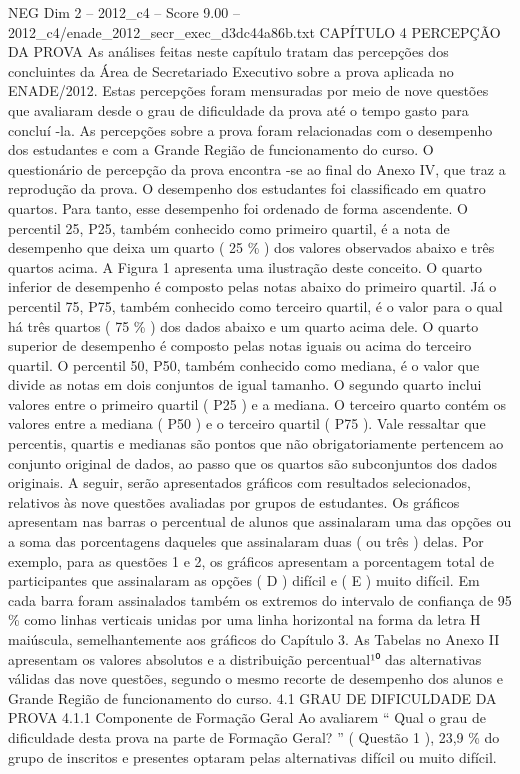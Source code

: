 \begin{textsample}{NEG Dim 2 – 2012\_c4 – Score 9.00 – 2012\_c4/enade\_2012\_secr\_exec\_d3dc44a86b.txt}  \label{ex:f2_neg_326}
CAPÍTULO 4 PERCEPÇÃO DA PROVA As análises feitas neste capítulo tratam das percepções dos concluintes da Área de Secretariado Executivo sobre a prova aplicada no ENADE/2012.
Estas percepções foram mensuradas por meio de nove questões que avaliaram desde o grau de dificuldade da prova até o tempo gasto para concluí -la.
As percepções sobre a prova foram relacionadas com o desempenho dos estudantes e com a Grande Região de funcionamento do curso.
O questionário de percepção da prova encontra -se ao final do Anexo IV, que traz a reprodução da prova.
O desempenho dos estudantes foi classificado em quatro quartos.
Para tanto, esse desempenho foi ordenado de forma ascendente.
O percentil 25, P25, também conhecido como primeiro quartil, é a nota de desempenho que deixa um quarto ( 25 \% ) dos valores observados abaixo e três quartos acima.
A Figura 1 apresenta uma ilustração deste conceito.
O quarto inferior de desempenho é composto pelas notas abaixo do primeiro quartil.
Já o percentil 75, P75, também conhecido como terceiro quartil, é o valor para o qual há três quartos ( 75 \% ) dos dados abaixo e um quarto acima dele.
O quarto superior de desempenho é composto pelas notas iguais ou acima do terceiro quartil.
O percentil 50, P50, também conhecido como mediana, é o valor que divide as notas em dois conjuntos de igual tamanho.
O segundo quarto inclui valores entre o primeiro quartil ( P25 ) e a mediana.
O terceiro quarto contém os valores entre a mediana ( P50 ) e o terceiro quartil ( P75 ).
Vale ressaltar que percentis, quartis e medianas são pontos que não obrigatoriamente pertencem ao conjunto original de dados, ao passo que os quartos são subconjuntos dos dados originais.
A seguir, serão apresentados gráficos com resultados selecionados, relativos às nove questões avaliadas por grupos de estudantes.
Os gráficos apresentam nas barras o percentual de alunos que assinalaram uma das opções ou a soma das porcentagens daqueles que assinalaram duas ( ou três ) delas.
Por exemplo, para as questões 1 e 2, os gráficos apresentam a porcentagem total de participantes que assinalaram as opções ( D ) difícil e ( E ) muito difícil.
Em cada barra foram assinalados também os extremos do intervalo de confiança de 95 \% como linhas verticais unidas por uma linha horizontal na forma da letra H maiúscula, semelhantemente aos gráficos do Capítulo 3.
As Tabelas no Anexo II apresentam os valores absolutos e a distribuição percentual¹⁰ das alternativas válidas das nove questões, segundo o mesmo recorte de desempenho dos alunos e Grande Região de funcionamento do curso. 4.1 GRAU DE DIFICULDADE DA PROVA 4.1.1 Componente de Formação Geral Ao avaliarem “ Qual o grau de dificuldade desta prova na parte de Formação Geral? ” ( Questão 1 ), 23,9 \% do grupo de inscritos e presentes optaram pelas alternativas difícil ou muito difícil.

\end{textsample}
